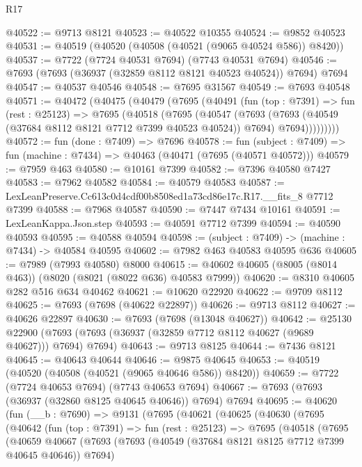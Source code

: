 \begin{lexlean}{R17}
\begin{coremodule}
@40522 := @9713 @8121
@40523 := @40522 @10355
@40524 := @9852 @40523
@40531 := @40519 (@40520 (@40508 (@40521 (@9065 @40524 @586)) @8420))
@40537 := @7722 (@7724 @40531 @7694) (@7743 @40531 @7694)
@40546 := @7693 (@7693 (@36937 (@32859 @8112 @8121 @40523 @40524)) @7694) @7694
@40547 := @40537 @40546
@40548 := @7695 @31567
@40549 := @7693 @40548
@40571 := @40472
    (@40475
      (@40479
        (@7695
          (@40491
            (fun (top : @7391) =>
            fun (rest : @25123) =>
            @7695
              (@40518
                (@7695
                  (@40547
                    (@7693
                      (@7693 (@40549 (@37684 @8112 @8121 @7712 @7399 @40523 @40524)) @7694)
                      @7694)))))))))
@40572 := fun (done : @7409) => @7696
@40578 := fun (subject : @7409) => fun (machine : @7434) => @40463 (@40471 (@7695 (@40571 @40572)))
@40579 := @7959 @463
@40580 := @10161 @7399
@40582 := @7396 @40580 @7427
@40583 := @7962 @40582
@40584 := @40579 @40583
@40587 := LexLeanPreserve.Cc613c0d4cdf00b8508ed1a73cd86e17c.R17.__fits_8 @7712 @7399
@40588 := @7968 @40587
@40590 := @7447 @7434 @10161
@40591 := LexLeanKappa.Json.step
@40593 := @40591 @7712 @7399
@40594 := @40590 @40593
@40595 := @40588 @40594
@40598 := (subject : @7409) -> (machine : @7434) -> @40584 @40595
@40602 := @7982 @463 @40583 @40595 @636
@40605 := @7989 (@7993 @40580) @8000
@40615 := @40602 @40605 (@8005 (@8014 @463)) (@8020 (@8021 (@8022 @636) @40583 @7999))
@40620 := @8310 @40605 @282 @516 @634 @40462
@40621 := @10620 @22920
@40622 := @9709 @8112
@40625 := @7693 (@7698 (@40622 @22897))
@40626 := @9713 @8112
@40627 := @40626 @22897
@40630 := @7693 (@7698 (@13048 @40627))
@40642 := @25130
    @22900
    (@7693 (@7693 (@36937 (@32859 @7712 @8112 @40627 (@9689 @40627))) @7694) @7694)
@40643 := @9713 @8125
@40644 := @7436 @8121
@40645 := @40643 @40644
@40646 := @9875 @40645
@40653 := @40519 (@40520 (@40508 (@40521 (@9065 @40646 @586)) @8420))
@40659 := @7722 (@7724 @40653 @7694) (@7743 @40653 @7694)
@40667 := @7693 (@7693 (@36937 (@32860 @8125 @40645 @40646)) @7694) @7694
@40695 := @40620
    (fun (__b : @7690) =>
    @9131
      (@7695
        (@40621
          (@40625
            (@40630
              (@7695
                (@40642
                  (fun (top : @7391) =>
                  fun (rest : @25123) =>
                  @7695
                    (@40518
                      (@7695
                        (@40659
                          @40667
                          (@7693
                            (@7693 (@40549 (@37684 @8121 @8125 @7712 @7399 @40645 @40646)) @7694)

\end{coremodule}
\end{lexlean}
